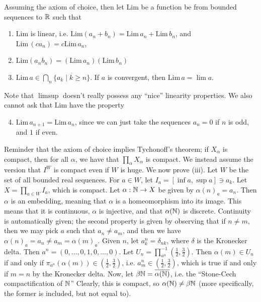 \begin{simplethm}
    Assuming the axiom of choice, then let $\mathrm{Lim}$ be a function be from bounded sequences to $\mathbb R$ such that
    \begin{enumerate}[label=(\roman*)]
        \item $\mathrm{Lim}$ is linear, i.e. $\mathrm{Lim}(a_n + b_n) = \mathrm{Lim} \, a_n + \mathrm{Lim} \, b_n$, and $\mathrm{Lim} \, (ca_n) = c \mathrm{Lim} \, a_n$, 
        \item $\mathrm{Lim} (a_n b_n) = (\mathrm{Lim} \, a_n)(\mathrm{Lim} \, b_n)$
        \item $\mathrm{Lim} \, a \in \bigcap_n \overline{\{a_k \mid k \geq n\}}$. If $a$ is convergent, then $\mathrm{Lim} \, a = \lim a$.
    \end{enumerate}
\end{simplethm}
\noindent Note that $\limsup$ doesn't really possess any ``nice'' linearity properties. We also cannot ask that $\mathrm{Lim}$ have the property
\begin{enumerate}[label=(\roman*)]
    \setcounter{enumi}{3}
    \item $\mathrm{Lim} \, a_{n+1} = \mathrm{Lim} \, a_n$, since we can just take the sequences $a_n = 0$ if $n$ is odd, and $1$ if even.
\end{enumerate}
Reminder that the axiom of choice implies Tychonoff's theorem; if $X_\alpha$ is compact, then for all $\alpha$, we have that $\prod_{\alpha} X_\alpha$ is compact. We instead assume the version that $I^W$ is compact even if $W$ is huge.
\medskip\newline
We now prove (iii). Let $W$ be the set of all bounded real sequences. For $a \in W$, let $I_a = [\inf a, \sup a] \ni a_k$. Let $X = \prod_{a \in W} I_a$, which is compact. Let $\alpha : \mathbb N \to X$ be given by $\alpha(n)_a = a_n$. Then $\alpha$ is an embedding, meaning that $\alpha$ is a homeomorphism into its image. This means that it is continuous, $\alpha$ is injective, and that $\alpha(\mathbb N)$ is discrete.
\medskip\newline
\noindent Continuity is automatically given; the second property is given by observing that if $n \neq m$, then we may pick $a$ such that $a_n \neq a_m$, and then we have $\alpha(n)_a = a_n \neq a_m = \alpha(m)_a$. Given $n$, let $a_k^n = \delta_{nk}$, where $\delta$ is the Kronecker delta. Then $a^n = (0, \dots, 0, 1, 0, \dots, 0)$. Let $U_n = \prod_{a^n}^{-1} \left(\frac{1}{2}, \frac{3}{2}\right)$. Then $\alpha(m) \in U_n$ if and only if $\pi_{a^n}(\alpha(m)) \in \left(\frac{1}{2}, \frac{3}{2}\right)$, i.e. $a_m^n \in \left(\frac{1}{2}, \frac{3}{2}\right)$, which is true if and only if $m = n$ by the Kronecker delta.
\medskip\newline
Now, let $\beta \mathbb N = \overline{\alpha(\mathbb N)}$, i.e. the ``Stone-Cech compactification of $\mathbb N$'' Clearly, this is compact, so $\alpha(\mathbb N) \neq \beta \mathbb N$ (more specifically, the former is included, but not equal to).


